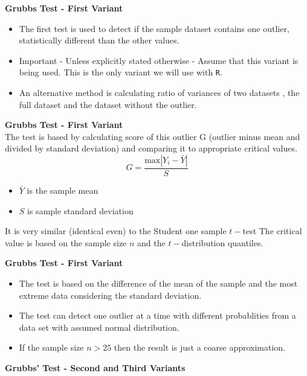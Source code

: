 \documentclass[a4paper,12pt]{article}
\begin{document}
\Large
\textbf{Grubbs Test - First Variant}\\


\begin{itemize}
	\item The first test is used to detect if the sample dataset contains one outlier, statistically different than
	the other values. 
	\item Important - Unless explicitly stated otherwise - Assume that this variant is being used. This is the only variant we will use with \texttt{R}.
	\item  An alternative method is calculating ratio of
	variances of two datasets , the full dataset and the dataset without the outlier.
\end{itemize}

\Large
\textbf{Grubbs Test - First Variant}\\
The test is based by calculating score of this outlier G (outlier minus mean and divided
by standard deviation) and comparing it to appropriate critical values.
\[ G = \frac{\mbox{max}|Y_i-\bar{Y}|}{S} \]

\begin{itemize}
	\item $\bar{Y}$ is the sample mean
	\item $S$ is sample standard deviation
\end{itemize}
It is very similar (identical even) to the Student one sample $t-$test
The critical value is based on the sample size $n$ and the $t-$distribution quantiles. 

\Large
\textbf{Grubbs Test - First Variant}
\begin{itemize}
	\item The test is based on the difference of the mean of the sample and the most
	extreme data considering the standard deviation.
	\item The test can detect one outlier at a time with different probablities from a data set with assumed normal distribution. 
	\item If the sample size $n>25$ then the result is
	just a coarse approximation.
\end{itemize}
\Large
\textbf{Grubbs' Test - Second and Third Variants}
\end{document}

